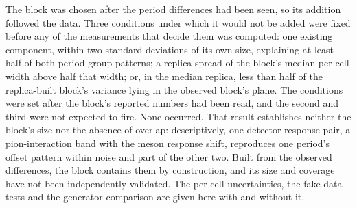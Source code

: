 The block was chosen after the period differences had been seen, so its addition followed the data. Three conditions under which it would not be added were fixed before any of the measurements that decide them was computed: one existing component, within two standard deviations of its own size, explaining at least half of both period-group patterns; a replica spread of the block's median per-cell width above half that width; or, in the median replica, less than half of the replica-built block's variance lying in the observed block's plane. The conditions were set after the block's reported numbers had been read, and the second and third were not expected to fire. None occurred. That result establishes neither the block's size nor the absence of overlap: descriptively, one detector-response pair, a pion-interaction band with the meson response shift, reproduces one period's offset pattern within noise and part of the other two. Built from the observed differences, the block contains them by construction, and its size and coverage have not been independently validated. The per-cell uncertainties, the fake-data tests and the generator comparison are given here with and without it.

